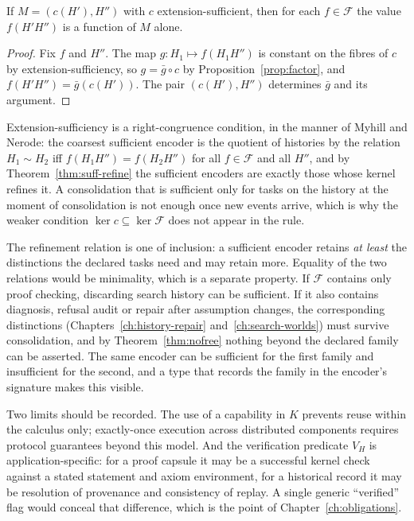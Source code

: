 \begin{proposition}
\label{prop:memanswers}
If $M=(c(H'),H'')$ with $c$ extension-sufficient, then for each $f\in\mathcal F$ the value $f(H'H'')$ is a function of $M$ alone.
\end{proposition}

\begin{proof}
Fix $f$ and $H''$. The map $g:H_1\mapsto f(H_1H'')$ is constant on the fibres of $c$ by extension-sufficiency, so $g=\bar g\circ c$ by Proposition~\ref{prop:factor}, and $f(H'H'')=\bar g(c(H'))$. The pair $(c(H'),H'')$ determines $\bar g$ and its argument.
\end{proof}

Extension-sufficiency is a right-congruence condition, in the manner of Myhill and Nerode: the coarsest sufficient encoder is the quotient of histories by the relation $H_1\sim H_2$ iff $f(H_1H'')=f(H_2H'')$ for all $f\in\mathcal F$ and all $H''$, and by Theorem~\ref{thm:suff-refine} the sufficient encoders are exactly those whose kernel refines it. A consolidation that is sufficient only for tasks on the history at the moment of consolidation is not enough once new events arrive, which is why the weaker condition $\ker c\subseteq\ker\mathcal F$ does not appear in the rule.

The refinement relation is one of inclusion: a sufficient encoder retains \emph{at least} the distinctions the declared tasks need and may retain more. Equality of the two relations would be minimality, which is a separate property. If $\mathcal F$ contains only proof checking, discarding search history can be sufficient. If it also contains diagnosis, refusal audit or repair after assumption changes, the corresponding distinctions (Chapters~\ref{ch:history-repair} and~\ref{ch:search-worlds}) must survive consolidation, and by Theorem~\ref{thm:nofree} nothing beyond the declared family can be asserted. The same encoder can be sufficient for the first family and insufficient for the second, and a type that records the family in the encoder's signature makes this visible.

Two limits should be recorded. The use of a capability in $K$ prevents reuse within the calculus only; exactly-once execution across distributed components requires protocol guarantees beyond this model. And the verification predicate $V_H$ is application-specific: for a proof capsule it may be a successful kernel check against a stated statement and axiom environment, for a historical record it may be resolution of provenance and consistency of replay. A single generic ``verified'' flag would conceal that difference, which is the point of Chapter~\ref{ch:obligations}.

